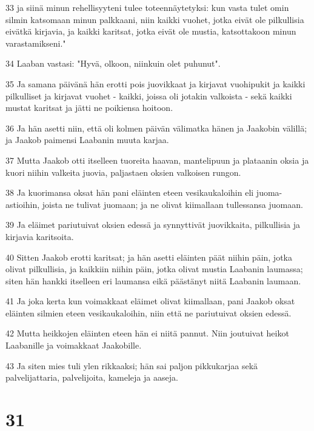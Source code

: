 \par 33 ja siinä minun rehellisyyteni tulee toteennäytetyksi: kun vasta tulet omin silmin katsomaan minun palkkaani, niin kaikki vuohet, jotka eivät ole pilkullisia eivätkä kirjavia, ja kaikki karitsat, jotka eivät ole mustia, katsottakoon minun varastamikseni."
\par 34 Laaban vastasi: "Hyvä, olkoon, niinkuin olet puhunut".
\par 35 Ja samana päivänä hän erotti pois juovikkaat ja kirjavat vuohipukit ja kaikki pilkulliset ja kirjavat vuohet - kaikki, joissa oli jotakin valkoista - sekä kaikki mustat karitsat ja jätti ne poikiensa hoitoon.
\par 36 Ja hän asetti niin, että oli kolmen päivän välimatka hänen ja Jaakobin välillä; ja Jaakob paimensi Laabanin muuta karjaa.
\par 37 Mutta Jaakob otti itselleen tuoreita haavan, mantelipuun ja plataanin oksia ja kuori niihin valkeita juovia, paljastaen oksien valkoisen rungon.
\par 38 Ja kuorimansa oksat hän pani eläinten eteen vesikaukaloihin eli juoma-astioihin, joista ne tulivat juomaan; ja ne olivat kiimallaan tullessansa juomaan.
\par 39 Ja eläimet pariutuivat oksien edessä ja synnyttivät juovikkaita, pilkullisia ja kirjavia karitsoita.
\par 40 Sitten Jaakob erotti karitsat; ja hän asetti eläinten päät niihin päin, jotka olivat pilkullisia, ja kaikkiin niihin päin, jotka olivat mustia Laabanin laumassa; siten hän hankki itselleen eri laumansa eikä päästänyt niitä Laabanin laumaan.
\par 41 Ja joka kerta kun voimakkaat eläimet olivat kiimallaan, pani Jaakob oksat eläinten silmien eteen vesikaukaloihin, niin että ne pariutuivat oksien edessä.
\par 42 Mutta heikkojen eläinten eteen hän ei niitä pannut. Niin joutuivat heikot Laabanille ja voimakkaat Jaakobille.
\par 43 Ja siten mies tuli ylen rikkaaksi; hän sai paljon pikkukarjaa sekä palvelijattaria, palvelijoita, kameleja ja aaseja.

\chapter{31}

